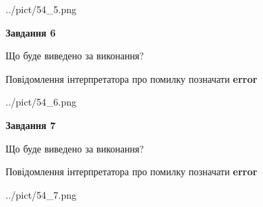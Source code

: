 \documentclass[10pt, ukrainian]{article}
\begin{document}
{\begin {large}
\begin{center}
	{../pict/54_5.png}
\end{center}
\newpage

{\begin {center}\textbf{Завдання 6}\end {center}}\par
Що буде виведено за виконання? \par
Повідомлення інтерпретатора про помилку позначати \textbf{error}

\begin{center}
	{../pict/54_6.png}
\end{center}
\newpage

{\begin {center}\textbf{Завдання 7}\end {center}}\par
Що буде виведено за виконання? \par
Повідомлення інтерпретатора про помилку позначати \textbf{error}

\begin{center}
	{../pict/54_7.png}
\end{center}
\newpage

\end {large}}
\end{document}
